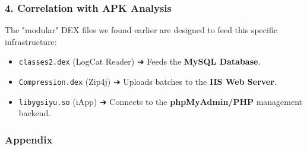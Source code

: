 \documentclass[
]{article}
\begin{document}
\subsubsection{4. Correlation with APK
Analysis}\label{4-correlation-with-apk-analysis}

The "modular" DEX files we found earlier are designed to feed this
specific infrastructure:

\begin{itemize}
\item
  \texttt{classes2.dex} (LogCat Reader) ➔ Feeds the \textbf{MySQL
  Database}.
\item
  \texttt{Compression.dex} (Zip4j) ➔ Uploads batches to the \textbf{IIS
  Web Server}.
\item
  \texttt{libygsiyu.so} (iApp) ➔ Connects to the \textbf{phpMyAdmin/PHP}
  management backend.
\end{itemize}

\subsubsection{Appendix}\label{appendix}
\end{document}
